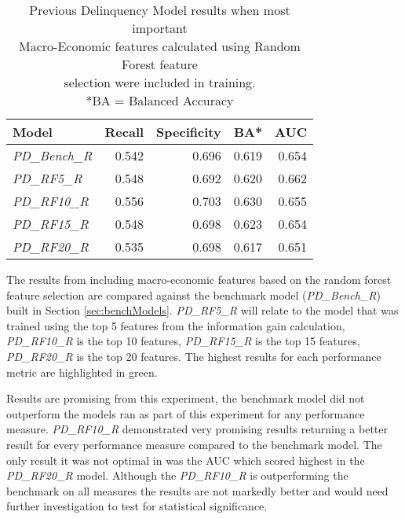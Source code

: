 \begin{table}[H]
\centering
\small
		\begin{tabular}{l r r r r}
			\hline
			\textbf{Model} & \textbf{Recall} & \textbf{Specificity} & \textbf{BA*} & \textbf{AUC}  \\ \hline
			\textit{PD\_Bench\_R} & 0.542 & 0.696 & 0.619 & 0.654 \\ \hline
			\textit{PD\_RF5\_R} & 0.548 & 0.692 & 0.620 & \cellcolor{green!25}0.662   \\ 
			\textit{PD\_RF10\_R} & \cellcolor{green!25}0.556 & \cellcolor{green!25}0.703 & \cellcolor{green!25}0.630 & 0.655  \\ 
			\textit{PD\_RF15\_R} & 0.548 & 0.698 & 0.623 & 0.654  \\
			\textit{PD\_RF20\_R} & 0.535 & 0.698 & 0.617 & 0.651  \\\hline 
		\end{tabular}

	\caption{Previous Delinquency Model results when most important\\
Macro-Economic features calculated using Random Forest feature \\selection were included in training.
\\ *BA = Balanced Accuracy}
	\label{table:RFPDModelResults}
\end{table}

The results from including macro-economic features based on the random forest feature selection are compared against the benchmark model (\textit{PD\_Bench\_R}) built in Section \ref{sec:benchModels}. \textit{PD\_RF5\_R} will relate to the model that was trained using the top 5 features from the information gain calculation, \textit{PD\_RF10\_R} is the top 10 features, \textit{PD\_RF15\_R} is the top 15 features, \textit{PD\_RF20\_R} is the top 20 features. The highest results for each performance metric are highlighted in green.

Results are promising from this experiment, the benchmark model did not outperform the models ran as part of this experiment for any performance measure. \textit{PD\_RF10\_R} demonstrated  very promising results returning a better result for every performance measure compared to the benchmark model. The only result it was not optimal in was the AUC which scored highest in the \textit{PD\_RF20\_R} model. Although the \textit{PD\_RF10\_R} is outperforming the benchmark on all measures the results are not markedly better and would need further investigation to test for statistical significance.

